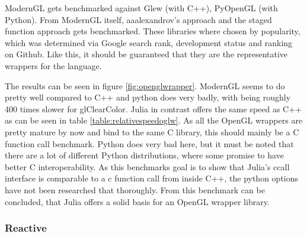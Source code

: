 ModernGL gets benchmarked against Glew (with C++), PyOpenGL (with Python). From ModernGL itself, aaalexandrov's approach and the staged function approach gets benchmarked.
These libraries where chosen by popularity, which was determined via Google search rank, development status and ranking on Github.
Like this, it should be guaranteed that they are the representative wrappers for the language.

The results can be seen in figure \ref{fig:openglwrapper}.
ModernGL seems to do pretty well compared to C++ and python does very badly, with being roughly 400 times slower for glClearColor.
Julia in contrast offers the same speed as C++ as can be seen in table \ref{table:relativespeedoglw}.
As all the OpenGL wrappers are pretty mature by now and bind to the same C library, this should mainly be a C function call benchmark.
Python does very bad here, but it must be noted that there are a lot of different Python distributions, where some promise to have better C interoperability. 
As this benchmarks goal is to show that Julia's ccall interface is comparable to a c function call from inside C++, the python options have not been researched that thoroughly.
From this benchmark can be concluded, that Julia offers a solid basis for an \ac{OpenGL} wrapper library.

\subsubsection{Reactive}

